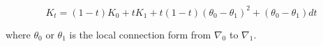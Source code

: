$$K_t = (1-t)K_0 + tK_1 + t(1-t)(\theta_0 - \theta_1)^2 + (\theta_0 - \theta_1)dt$$

where $\theta_0$ or $\theta_1$ is the local connection form from $\nabla_0$ to $\nabla_1$.
